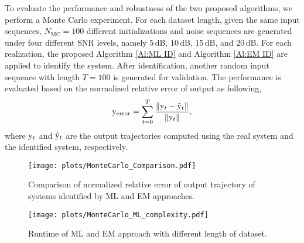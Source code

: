 To evaluate the performance and robustness of the two proposed algorithms, we perform a Monte Carlo experiment. For each dataset length, given the same input sequences, $N_{\text{MC}} = 100$ different initializations and noise sequences are generated under four different SNR levels, namely $5\,$dB, $10\,$dB, $15\,$dB, and  $20\,$dB.  For each realization, the proposed Algorithm \ref{Al:ML ID} and Algorithm \ref{Al:EM ID} are applied to identify the system. After identification, another random input sequence with length $T = 100$ is generated for validation. The performance is evaluated based on the normalized relative error of output as following,
\begin{equation}\label{eq:Normalized relative error}
    { \mathrm{y} }_{\text{error}} = \sum_{t=0}^{T} \frac{\lVert { \mathrm{y} }_t - \hat{{ \mathrm{y} }}_t \rVert} {\lVert { \mathrm{y} }_t \rVert},  
\end{equation}
where ${ \mathrm{y} }_t$ and $\hat{{ \mathrm{y} }}_t$ are the output trajectories computed using the real system and the identified system, respectively. 

\begin{figure}[t!]
   \centering
   \texttt{[image: plots/MonteCarlo\_Comparison.pdf]}
   \caption{Comparison of normalized relative error of output trajectory of systems identified by ML and EM approaches.}
   \label{img:MC_comparison}
\end{figure}


\begin{figure}[t!]
   \centering
   \texttt{[image: plots/MonteCarlo\_ML\_complexity.pdf]}
   \caption{Runtime of ML and EM approach with different length of dataset.}
   \label{img:ML_com}
\end{figure}

